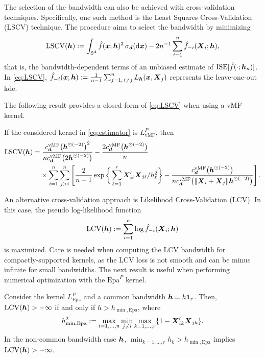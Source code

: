 \documentclass[oneside,11pt]{article}
\begin{document}
The selection of the bandwidth can also be achieved with cross-validation techniques. Specifically, one such method is the Least Squares Cross-Validation (LSCV) technique. %
The procedure aims to select the bandwidth by minimizing
\begin{align}\label{eq:LSCV}
    \mathrm{LSCV}({\boldsymbol{h}}):=\int_{\mathbb{S}^{\boldsymbol{d}}}\hat{f}(\boldsymbol{x};{\boldsymbol{h}})^2 \,\sigma_{\boldsymbol{d}} (\mathrm{d}\boldsymbol{x})-2n^{-1}\sum_{i=1}^n\hat{f}_{-i}(\boldsymbol{X}_i;{\boldsymbol{h}}),
\end{align}
that is, the bandwidth-dependent terms of an unbiased estimate of $\mathrm{ISE}[\hat{f}(\cdot;{\boldsymbol{h}}_n)]$. In \eqref{eq:LSCV}, $\hat{f}_{-i}(\boldsymbol{x};{\boldsymbol{h}}):=\allowbreak \frac{1}{n-1}\sum_{j=1,\,i\neq j}^nL_{{\boldsymbol{h}}}(\boldsymbol{x},\boldsymbol{X}_j)$ represents the leave-one-out kde.

The following result provides a closed form of \eqref{eq:LSCV} when using a vMF kernel.

\begin{proposition}\label{prop:LSCV}
If the considered kernel in \eqref{eq:estimator} is $L_\mathrm{vMF}^P$, then
\begin{align*}
\mathrm{LSCV}({\boldsymbol{h}})=&\;\frac{c_{\boldsymbol{d}}^{\mathrm{vMF}}\big({\boldsymbol{h}}^{\odot(-2)}\big)^2}{n c_{\boldsymbol{d}}^{\mathrm{vMF}}\big(2 {\boldsymbol{h}}^{\odot(-2)}\big)}-\frac{2 c_{\boldsymbol{d}}^{\mathrm{vMF}}\big({\boldsymbol{h}}^{\odot(-2)}\big)}{n}\\
                &\times \sum_{i=1}^n \sum_{j>i}^n\left[\frac{2}{n-1} \exp\bigg\{\sum_{\ell=1}^r \boldsymbol{X}_{i\ell}'\boldsymbol{X}_{j\ell}/h_\ell^2\bigg\}-\frac{c_{\boldsymbol{d}}^{\mathrm{vMF}}\big({\boldsymbol{h}}^{\odot(-2)}\big)}{n c_{\boldsymbol{d}}^{\mathrm{vMF}}\big(\|\boldsymbol{X}_i+\boldsymbol{X}_j\|  {\boldsymbol{h}}^{\odot(-2)}\big)}\right].
\end{align*}
\end{proposition}

An alternative cross-validation approach is Likelihood Cross-Validation (LCV). In this case, the pseudo log-likelihood function
\begin{align*}
    \mathrm{LCV}({\boldsymbol{h}}):=\sum_{i=1}^n\log\hat{f}_{-i}(\boldsymbol{X}_i;{\boldsymbol{h}})
\end{align*}
is maximized. Care is needed when computing the LCV bandwidth for compactly-supported kernels, as the LCV loss is not smooth and can be minus infinite for small bandwidths. The next result is useful when performing numerical optimization with the $\mathrm{Epa}^P$ kernel.

\begin{proposition} \label{prop:hmin}
Consider the kernel $L_\mathrm{Epa}^P$ and a common bandwidth ${\boldsymbol{h}}=h\mathbf{1}_r$. Then, $\mathrm{LCV}({\boldsymbol{h}}) > -\infty$ if and only if $h > h_{\min,\mathrm{Epa}}$, where
\begin{align*}
    h_{\min,\mathrm{Epa}}^2:= \max_{i=1,\ldots,n} \min_{j\neq i} \max_{k=1,\ldots,r}\{1-\boldsymbol{X}_{ik}'\boldsymbol{X}_{jk}\}.
\end{align*}
In the non-common bandwidth case ${\boldsymbol{h}}$, $\min_{k=1,\ldots,r}h_k > h_{\min,\mathrm{Epa}}$ implies $\mathrm{LCV}({\boldsymbol{h}}) > -\infty$.
\end{proposition}
\end{document}
